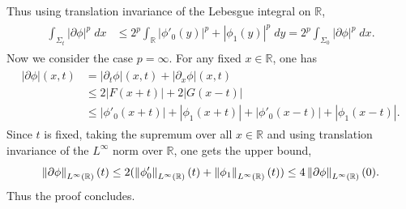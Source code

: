 \documentclass{article}
\begin{document}
Thus using translation invariance of the Lebesgue integral on $\mathbb{R}$, 
\begin{align*}
	\begin{split}
		\int_{\Sigma_{t}}|\partial \phi|^{p}\;dx &\leq 2^{p}\int_{\mathbb{R}}|\phi'_{0}(y)|^{p} + |\phi_{1}(y)|^{p}\;dy  = 2^{p}\int_{\Sigma_{0}}|\partial \phi|^{p}\;dx. 
	\end{split} 
\end{align*}
Now we consider the case $p = \infty$. For any fixed $x \in \mathbb{R}$, one has 
\begin{align*}
	\begin{split} 
	|\partial\phi|(x, t) &= |\partial_{t}\phi|(x, t) + |\partial_{x}\phi|(x, t) \\
	&\leq 2|F(x + t)| + 2|G(x - t)| \\
	&\leq |\phi'_{0}(x+ t)| + |\phi_{1}(x + t)| + |\phi'_{0}(x -t)| + |\phi_{1}(x -t )|. 
	\end{split} 
\end{align*} 
Since $t$ is fixed, taking the supremum over all $x \in \mathbb{R}$ and using translation invariance of the $L^{\infty}$ norm over $\mathbb{R}$, one gets the upper bound, 
\begin{equation*}
	\left\Vert \partial \phi \right\Vert_{L^{\infty}(\mathbb{R})}(t) \leq 2(\left\Vert \phi'_{0} \right\Vert_{L^{\infty}(\mathbb{R})}(t) + \left\Vert \phi_{1} \right\Vert_{L^{\infty}(\mathbb{R})}(t)) \leq 4\left\Vert \partial \phi \right\Vert_{L^{\infty}(\mathbb{R})}(0). 
\end{equation*}
Thus the proof concludes. 
\end{document}
